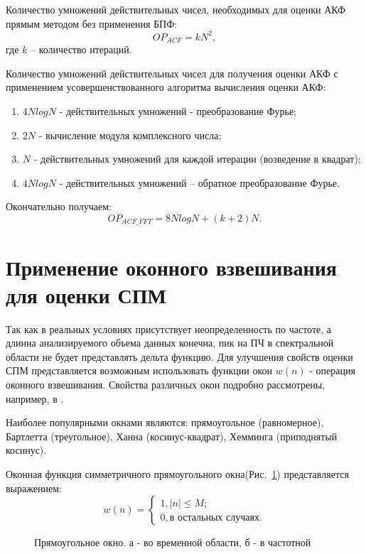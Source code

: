 Количество умножений действительных чисел, необходимых для оценки АКФ прямым методом без применения БПФ: 
\begin{equation}
	\label{eq:num_of_op_acf}
	OP_{ACF}=kN^2,
\end{equation}
где ${k}$  – количество итераций.

Количество умножений действительных чисел для получения оценки АКФ с применением усовершенствованного алгоритма вычисления оценки АКФ:
\begin{enumerate}
\item ${4NlogN}$ - действительных умножений - преобразование Фурье;
\item ${2N}$ - вычисление модуля комплексного числа;
\item ${N}$ - действительных умножений для каждой итерации (возведение в квадрат);
\item ${4NlogN}$ - действительных умножений – обратное преобразование Фурье. 
\end{enumerate}

Окончательно получаем:
\begin{equation}
	\label{eq:num_of_op_acf}
	OP_{ACF\_FFT}=8NlogN + (k+2)N.
\end{equation}

\section{Применение оконного взвешивания для оценки СПМ}

Так как в реальных условиях присутствует неопределенность по частоте, а длинна анализируемого объема данных конечна, пик на ПЧ в спектральной области не будет
представлять дельта функцию. Для улучшения свойств оценки СПМ представляется возможным использовать функции окон ${w(n)}$ - операция оконного взвешивания.
Свойства различных окон подробно рассмотрены, например, в \cite{shahtarin-spectrum-book, bolshakov-book}.

Наиболее популярными окнами являются: прямоугольное (равномерное), Бартлетта (треугольное), Ханна (косинус-квадрат), Хемминга (приподнятый косинус).

Оконная функция симметричного прямоугольного окна(\mbox{Рис. \ref{pic:win_rect}}) представляется выражением:
\begin{equation}
	\label{eq:rect_window}
	 w(n) = \begin{cases}
		1, |n| \le M; \\
		0, \mbox{в остальных случаях}.
		\end{cases}
\end{equation}
\begin{figure}[h]
	\center{}
	\caption{Прямоугольное окно. а - во временной области, б - в частотной}
	\label{pic:win_rect}
\end{figure}

